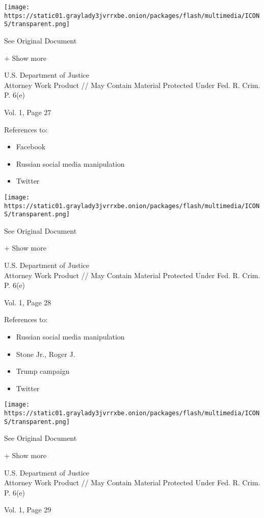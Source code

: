 \protect\hyperlink{}{}

\texttt{[image: https://static01.graylady3jvrrxbe.onion/packages/flash/multimedia/ICONS/transparent.png]}

See Original Document

+ Show more

U.S. Department of Justice\\
Attorney Work Product // May Contain Material Protected Under Fed. R.
Crim. P. 6(e)

Vol. 1, Page 27

References to:

\begin{itemize}
\tightlist
\item
  Facebook
\item
  Russian social media manipulation
\item
  Twitter
\end{itemize}

\protect\hyperlink{}{}

\texttt{[image: https://static01.graylady3jvrrxbe.onion/packages/flash/multimedia/ICONS/transparent.png]}

See Original Document

+ Show more

U.S. Department of Justice\\
Attorney Work Product // May Contain Material Protected Under Fed. R.
Crim. P. 6(e)

Vol. 1, Page 28

References to:

\begin{itemize}
\tightlist
\item
  Russian social media manipulation
\item
  Stone Jr., Roger J.
\item
  Trump campaign
\item
  Twitter
\end{itemize}

\protect\hyperlink{}{}

\texttt{[image: https://static01.graylady3jvrrxbe.onion/packages/flash/multimedia/ICONS/transparent.png]}

See Original Document

+ Show more

U.S. Department of Justice\\
Attorney Work Product // May Contain Material Protected Under Fed. R.
Crim. P. 6(e)

Vol. 1, Page 29

